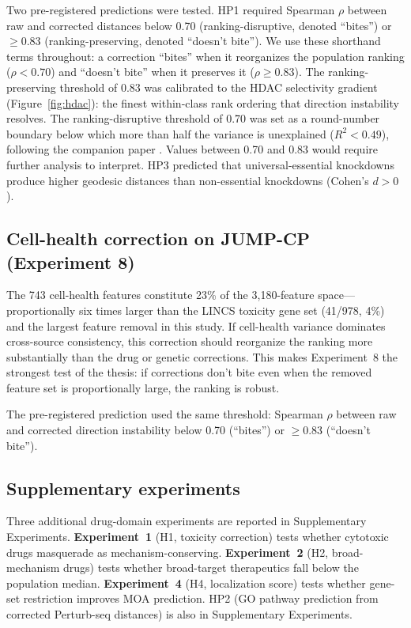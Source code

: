 \documentclass[11pt]{article}
\begin{document}
Two pre-registered predictions were tested.
HP1 required Spearman $\rho$ between raw and corrected distances below
0.70 (ranking-disruptive, denoted ``bites'') or $\geq 0.83$
(ranking-preserving, denoted ``doesn't bite''). We use these shorthand
terms throughout: a correction ``bites'' when it reorganizes the
population ranking ($\rho < 0.70$) and ``doesn't bite'' when it
preserves it ($\rho \geq 0.83$). The ranking-preserving threshold of
0.83 was calibrated to the HDAC selectivity gradient (Figure~\ref{fig:hdac}):
the finest within-class rank ordering that direction instability
resolves. The ranking-disruptive threshold of 0.70 was set as a
round-number boundary below which more than half the variance is
unexplained ($R^2 < 0.49$), following the companion paper
\citep{tower2026drug}. Values between 0.70 and 0.83 would require
further analysis to interpret.
HP3 predicted that universal-essential knockdowns produce higher geodesic
distances than non-essential knockdowns (Cohen's $d > 0$).

\subsection{Cell-health correction on JUMP-CP (Experiment 8)}

The 743 cell-health features constitute 23\% of the 3{,}180-feature
space---proportionally six times larger than the LINCS toxicity gene set
(41/978, 4\%) and the largest feature removal in this study. If cell-health
variance dominates cross-source consistency, this correction should
reorganize the ranking more substantially than the drug or genetic
corrections. This makes Experiment~8 the strongest test of the thesis:
if corrections don't bite even when the removed feature set is
proportionally large, the ranking is robust.

The pre-registered prediction used the same threshold: Spearman $\rho$
between raw and corrected direction instability below 0.70 (``bites'')
or $\geq 0.83$ (``doesn't bite'').

\subsection{Supplementary experiments}

Three additional drug-domain experiments are reported in Supplementary
Experiments. \textbf{Experiment~1}
(H1, toxicity correction) tests whether cytotoxic drugs masquerade as
mechanism-conserving. \textbf{Experiment~2} (H2, broad-mechanism drugs)
tests whether broad-target therapeutics fall below the population median.
\textbf{Experiment~4} (H4, localization score) tests whether gene-set
restriction improves MOA prediction. HP2 (GO pathway prediction from
corrected Perturb-seq distances) is also in Supplementary Experiments.
\end{document}
